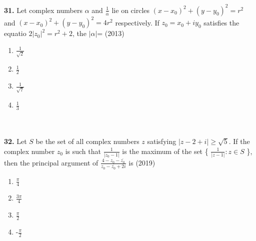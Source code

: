 \documentclass[journal,12pt,twocolumn]{IEEEtran}
\theoremstyle{remark}
\begin{document}
\\\\
\textbf{31.} Let complex numbers $\alpha$ and $\frac{1}{\overline{\alpha}}$ lie on circles $(x-x_{0})^{2}+(y-y_{0})^{2}=r^{2}$ and $(x-x_{0})^{2}+(y-y_{0})^{2}=4r^{2}$ respectively. If $z_{0}=x_{0}+iy_{0}$ satisfies the equatio  $2|z_{0}| ^{2}=r^{2}+2$, the $|\alpha|$= \hfill{(2013)}
\begin{enumerate}[label=(\alph*)]
	\item $\frac{1}{\sqrt{2}}$
	\item $\frac{1}{2}$
	\item $\frac{1}{\sqrt{7}}$
	\item $\frac{1}{3}$
\end{enumerate}
\\\\
\textbf{32.} Let $S$ be the set of all complex numbers $z$ satisfying $|z-2+i|\geq\sqrt{5}$. If the complex number $z_{0}$ is such that $\frac{1}{|z_{0}-1|}$ is the maximum of the set \{ $\frac{1}{|z-1|} : z \in S$ \}, then the principal argument of $\frac{4-z_{0}-\overline{z_{0}}}{z_{0}-\overline{z_{0}}+2i}$ is  \hfill{(2019)}
\begin{enumerate}[label=(\alph*)]
	\item $\frac{\pi}{4}$
	\item $\frac{3\pi}{4}$
	\item $\frac{\pi}{2}$
	\item -$\frac{\pi}{2}$
\end{enumerate}
\\\\
\end{document}
